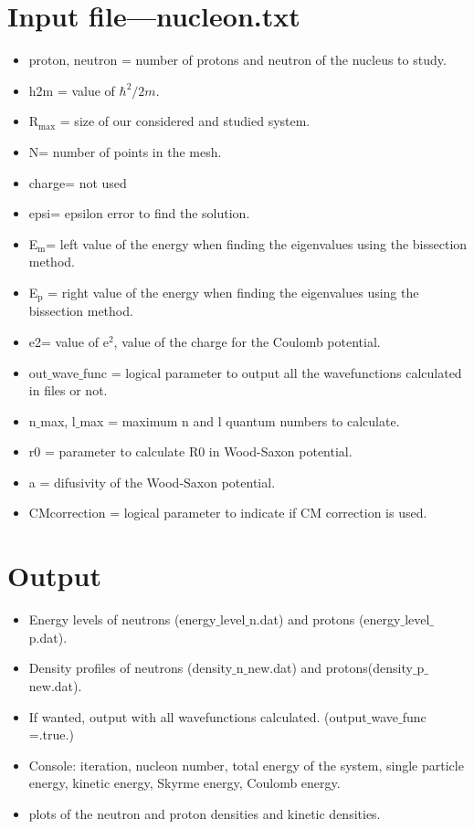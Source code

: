 \documentclass[a4paper,10pt]{article}
\begin{document}
\section{Input file---nucleon.txt}
\begin{itemize}
 \item proton, neutron = number of protons and neutron of the nucleus to study. 
  \item h2m = value of $\hbar^2/2m$.
   \item R$_\mathrm{max}$ = size of our considered and studied system.
    \item N= number of points in the mesh.
    \item charge= not used
 \item epsi= epsilon error to find the solution. 
 \item E$_\mathrm{m}$= left value of the energy when finding the eigenvalues using the bissection method.
 \item E$_\mathrm{p}$ = right value of the energy when finding the eigenvalues using the bissection method.
 \item e2= value of e$^2$, value of the charge for the Coulomb potential.
 \item out$\_$wave$\_$func = logical parameter to output all the wavefunctions calculated in files or not.
 \item n$\_$max, l$\_$max = maximum n and l quantum numbers to calculate.
 \item r0 = parameter to calculate R0 in Wood-Saxon potential. 
 \item a = difusivity of the Wood-Saxon potential. 
 \item CMcorrection = logical parameter to indicate if CM correction is used.

\end{itemize}

\section{Output}
\begin{itemize}
 \item Energy levels of neutrons (energy$\_$level$\_$n.dat) and protons (energy$\_$level$\_$p.dat).
 \item Density profiles of neutrons (density$\_$n$\_$new.dat) and protons(density$\_$p$\_$new.dat).
 \item If wanted, output with all wavefunctions calculated. (output$\_$wave$\_$func =.true.)
 \item Console: iteration, nucleon number, total energy of the system, single particle energy, kinetic energy, 
 Skyrme energy, Coulomb energy.
 \item plots of the neutron and proton densities and kinetic densities.
\end{itemize}
\end{document}
